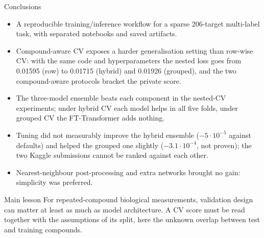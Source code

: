 \documentclass[aspectratio=169,10pt]{beamer}
\begin{document}
\begin{frame}{Conclusions}
\begin{itemize}
  \item A reproducible training/inference workflow for a sparse 206-target multi-label task, with separated notebooks and saved artifacts.
  \item Compound-aware CV exposes a harder generalisation setting than row-wise CV: with the same code and hyperparameters the nested loss goes from 0.01595 (row) to 0.01715 (hybrid) and 0.01926 (grouped), and the two compound-aware protocols bracket the private score.
  \item The three-model ensemble beats each component in the nested-CV experiments; under hybrid CV each model helps in all five folds, under grouped CV the FT-Transformer adds nothing.
  \item Tuning did not measurably improve the hybrid ensemble ($-5\cdot10^{-5}$ against defaults) and helped the grouped one slightly ($-3.1\cdot10^{-4}$, not proven); the two Kaggle submissions cannot be ranked against each other.
  \item Nearest-neighbour post-processing and extra networks brought no gain: simplicity was preferred.
\end{itemize}
\vspace{0.5em}
\begin{alertblock}{Main lesson}
For repeated-compound biological measurements, validation design can matter at least as much as model architecture. A CV score must be read together with the assumptions of its split, here the unknown overlap between test and training compounds.
\end{alertblock}
\end{frame}
\end{document}
